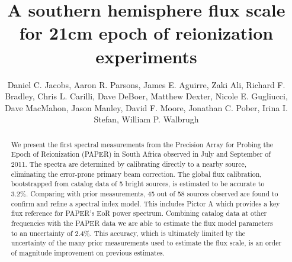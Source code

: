 \documentclass[preprint]{aastex}
\begin{document}
\title{A southern hemisphere flux scale for 21cm epoch of reionization experiments}
\author{
Daniel C. Jacobs,
Aaron R. Parsons,
James E. Aguirre,
Zaki Ali,
Richard F. Bradley,
Chris L.  Carilli,
Dave DeBoer,
Matthew Dexter,
Nicole E. Gugliucci,
Dave MacMahon,
Jason Manley,
David F. Moore,
Jonathan C. Pober,
Irina I. Stefan,
William P. Walbrugh}


\begin{abstract}
We present the first spectral measurements from the Precision Array for Probing the Epoch of Reionization (PAPER) in South Africa observed in July and September of 2011.  The spectra are determined by calibrating directly to a nearby source, eliminating the error-prone primary beam correction.  The global flux calibration, bootstrapped from catalog data of 5 bright sources, is estimated to be accurate to 3.2\%.  Comparing with prior measurements, 45 out of 58 sources observed are found to confirm and refine a spectral index model. This includes Pictor A which provides a key flux reference for PAPER's EoR power spectrum. Combining catalog data at other frequencies with the PAPER data we are able to estimate the flux model parameters to an uncertainty of 2.4\%. This accuracy, which is ultimately limited by the uncertainty of the many prior measurements used to estimate the flux scale, is an order of magnitude improvement on previous estimates.  
\end{abstract}

\end{document}
